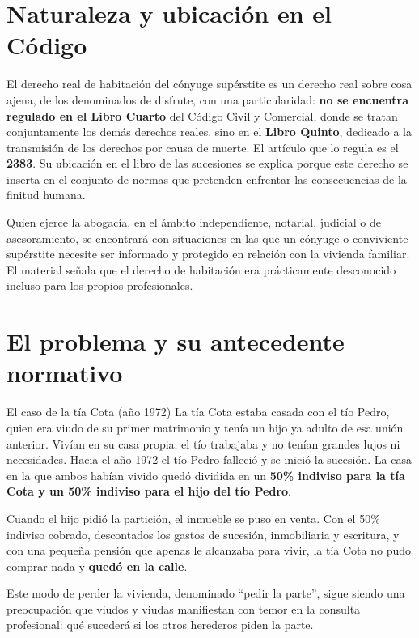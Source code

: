 \documentclass[12pt,oneside]{book}
\begin{document}
\section{Naturaleza y ubicación en el Código}

El derecho real de habitación del cónyuge supérstite es un derecho real sobre cosa ajena, de los denominados de disfrute, con una particularidad: \textbf{no se encuentra regulado en el Libro Cuarto} del Código Civil y Comercial, donde se tratan conjuntamente los demás derechos reales, sino en el \textbf{Libro Quinto}, dedicado a la transmisión de los derechos por causa de muerte. El artículo que lo regula es el \textbf{2383}. Su ubicación en el libro de las sucesiones se explica porque este derecho se inserta en el conjunto de normas que pretenden enfrentar las consecuencias de la finitud humana.

\begin{nota}
Quien ejerce la abogacía, en el ámbito independiente, notarial, judicial o de asesoramiento, se encontrará con situaciones en las que un cónyuge o conviviente supérstite necesite ser informado y protegido en relación con la vivienda familiar. El material señala que el derecho de habitación era prácticamente desconocido incluso para los propios profesionales.
\end{nota}

\section{El problema y su antecedente normativo}

\begin{ejemplo}{El caso de la tía Cota (año 1972)}
La tía Cota estaba casada con el tío Pedro, quien era viudo de su primer matrimonio y tenía un hijo ya adulto de esa unión anterior. Vivían en su casa propia; el tío trabajaba y no tenían grandes lujos ni necesidades. Hacia el año 1972 el tío Pedro falleció y se inició la sucesión. La casa en la que ambos habían vivido quedó dividida en un \textbf{50\% indiviso para la tía Cota y un 50\% indiviso para el hijo del tío Pedro}.

Cuando el hijo pidió la partición, el inmueble se puso en venta. Con el 50\% indiviso cobrado, descontados los gastos de sucesión, inmobiliaria y escritura, y con una pequeña pensión que apenas le alcanzaba para vivir, la tía Cota no pudo comprar nada y \textbf{quedó en la calle}.
\end{ejemplo}

Este modo de perder la vivienda, denominado ``pedir la parte'', sigue siendo una preocupación que viudos y viudas manifiestan con temor en la consulta profesional: qué sucederá si los otros herederos piden la parte.
\end{document}
